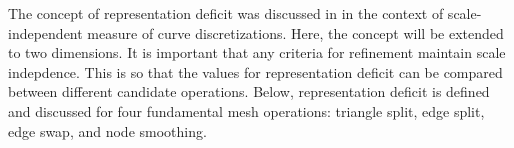 The concept of representation deficit was discussed in \cite{mclaurin13}
in the context of scale-independent measure of curve discretizations.
Here, the concept will be extended to two dimensions. It is important
that any criteria for refinement maintain scale indepdence. This is so
that the values for representation deficit can be compared between
different candidate operations. Below, representation deficit is defined
and discussed for four fundamental mesh operations: triangle split, edge
split, edge swap, and node smoothing.
